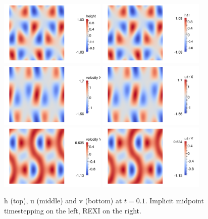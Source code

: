 \documentclass[14pt]{article}
\begin{document}
\begin{figure}
  \centering
  \includegraphics[width=0.45\textwidth]{results/t0.1/IM_h}
  \includegraphics[width=0.45\textwidth]{results/t0.1/rexi_h}\\
  \includegraphics[width=0.45\textwidth]{results/t0.1/IM_u}
  \includegraphics[width=0.45\textwidth]{results/t0.1/rexi_u}\\
  \includegraphics[width=0.45\textwidth]{results/t0.1/IM_v}
  \includegraphics[width=0.45\textwidth]{results/t0.1/rexi_v}
\caption{h (top), u (middle) and v (bottom) at $t=0.1$. Implicit midpoint timestepping on the left, REXI on the right.}
\end{figure}
\end{document}
